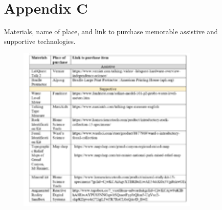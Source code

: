 \documentclass[11pt]{sig-alternate}
\begin{document}
\begin{large}
\begin{figure}[htp]
\end{figure}

\newpage

\section*{Appendix C}\par 

Materials, name of place, and link to purchase memorable assistive and supportive technologies.
\begin{figure}[htp]
    \centering
    \includegraphics[width=9cm]{Table3.png}

\end{figure}
\end{large}
\end{document}
